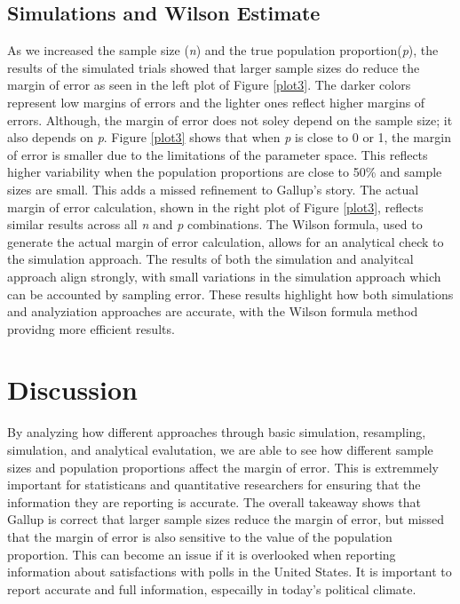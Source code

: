 \documentclass{article}\usepackage[]{graphicx}\usepackage[]{xcolor}
\begin{document}
\begin{multicols}{2}
\subsection{Simulations and Wilson Estimate}
As we increased the sample size (\emph{n}) and the true population proportion(\emph{p}), the results of the simulated trials showed that larger sample sizes do reduce the margin of error as seen in the left plot of Figure \ref{plot3}. The darker colors represent low margins of errors and the lighter ones reflect higher margins of errors. Although, the margin of error does not soley depend on the sample size; it also depends on \emph{p}. Figure \ref{plot3} shows that when \emph{p} is close to 0 or 1, the margin of error is smaller due to the limitations of the parameter space. This reflects higher variability when the population proportions are close to 50\% and sample sizes are small. This adds a missed refinement to  Gallup's story.
The actual margin of error calculation, shown in the right plot of Figure \ref{plot3}, reflects similar results across all \emph{n} and \emph{p} combinations. The Wilson formula, used to generate the actual margin of error calculation, allows for an analytical check to the simulation approach. The results of both the simulation and analyitcal approach align strongly, with small variations in the simulation approach which can be accounted by sampling error. 
These results highlight how both simulations and analyziation approaches are accurate, with the Wilson formula method providng more efficient results. 

\section{Discussion}
By analyzing how different approaches through basic simulation, resampling, simulation, and analytical evalutation, we are able to see how different sample sizes and population proportions affect the margin of error. This is extremmely important for statisticans and quantitative researchers for ensuring that the information they are reporting is accurate. The overall takeaway shows that Gallup is correct that larger sample sizes reduce the margin of error, but missed that the margin of error is also sensitive to the value of the population proportion. This can become an issue if it is overlooked when reporting information about satisfactions with polls in the United States. It is important to report accurate and full information, especailly in today's political climate.

\vspace{2em}
\begin{tiny}

\end{tiny}
\end{multicols}
\end{document}

